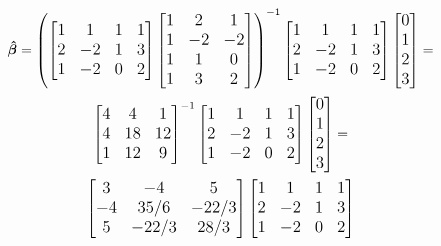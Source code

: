 \documentclass{homework2_template}
\begin{document}
\begin{equation*}
\begin{gathered}
{\large
\bm{\hat{\beta}} =  
\left(
\begin{bmatrix}
 1 & 1 & 1 & 1 \\
 2 & -2 & 1 & 3 \\
 1 & -2 & 0 & 2 \\
\end{bmatrix}
\begin{bmatrix}
1 & 2 & 1 \\
1 & -2 & -2 \\
1 & 1 & 0 \\
1 & 3 & 2
\end{bmatrix}
\right)^{-1}
\begin{bmatrix}
 1 & 1 & 1 & 1 \\
 2 & -2 & 1 & 3 \\
 1 & -2 & 0 & 2 \\
\end{bmatrix}
\begin{bmatrix}
0 \\
1 \\
2 \\
3
\end{bmatrix} = }\\
{\large
\begin{bmatrix}
4 &	4 &	1 \\
4 &	18 & 12 \\
1 &	12 & 9
\end{bmatrix}^{-1}
\begin{bmatrix}
 1 & 1 & 1 & 1 \\
 2 & -2 & 1 & 3 \\
 1 & -2 & 0 & 2 \\
\end{bmatrix}
\begin{bmatrix}
0 \\
1 \\
2 \\
3
\end{bmatrix} = }\\
{\large
\begin{bmatrix}
3 &	-4 & 5 \\
-4 & 35/6 & -22/3 \\
5 &	-22/3 &	28/3
\end{bmatrix}
\begin{bmatrix}
 1 & 1 & 1 & 1 \\
 2 & -2 & 1 & 3 \\
 1 & -2 & 0 & 2 \\

\end{bmatrix}}
\end{gathered}
\end{equation*}
\end{document}
